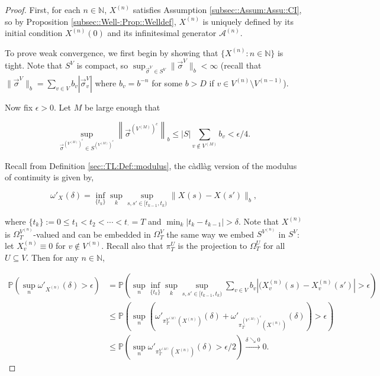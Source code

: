 \documentclass[12pt]{article}
\newcommand{\mb}{\mathbb}
\newcommand{\mc}{\mathcal}
\newcommand{\ra}{\rightarrow}
\newcommand{\os}{\overset}
\newcommand{\ep}{\epsilon}
\newcommand{\ind}{\hspace{24pt}}
\newcommand{\pr}{\mb{P}}							%
\renewcommand{\v}{v}							%
\renewcommand{\U}{U}							%
\renewcommand{\S}{S}							%
\newcommand{\s}{\sigma}							%
\newcommand{\sv}{\vec{\s}}						%
\renewcommand{\b}{b}							%
\newcommand{\T}{T}								%
\renewcommand{\t}{t}							%
\newcommand{\sset}{\Omega}						%
\newcommand{\proj}{\pi}							%
\renewcommand{\tt}{s}							%
\newcommand{\ttt}{s'}							%
\newcommand{\X}{X}								%
\newcommand{\IG}{\mc{A}}						%
\newcommand{\carp}[1]{^{#1}}					%
\newcommand{\vsi}[1]{^{#1}}						%
\newcommand{\cind}[1]{_{#1}}					%
\newcommand{\tp}[1]{(#1)}						%
\newcommand{\tip}[1]{#1}						%
\newcommand{\ts}[1]{_{#1}}						%
\newcommand{\degr}{D}							%
\newcommand{\sln}[1]{^{(#1)}}					%
\newcommand{\cconst}{M}							%
\newcommand{\cmodu}{\omega'}					%
\newcommand{\pra}[1]{_{#1}}						%
\newcommand{\indx}[1]{_{#1}}					%
\renewcommand{\it}{k}							%
\begin{document}
\begin{proof}
First, for each \(n\in\mb{N}\), \(\X\sln{n}\cind{}\tip{}\) satisfies Assumption \ref{subsec::Assum:Assu::CI}, so by Proposition \ref{subsec::Well-:Prop::Welldef}, \(\X\sln{n}\cind{}\tip{}\) is uniquely defined by its initial condition \(\X\sln{n}\cind{}\tp{0}\) and its infinitesimal generator \(\IG\sln{n}\).

\ind To prove weak convergence, we first begin by showing that \(\{\X\sln{n}\cind{}\tip{}:n\in \mb{N}\}\) is tight. Note that \(\S\carp{V}\) is compact, so \(\sup_{\sv\cind{}\vsi{V} \in \S\carp{V}} \|\sv\cind{}\vsi{V}\|_{\b} < \infty\) (recall that \(\|\sv\cind{}\vsi{V}\|_{\b} = \sum_{\v \in V} \b\cind{\v} |\sv\cind{\v}\vsi{V}|\) where \(\b\cind{\v} = \b^{-n}\) for some \(\b > \degr\) if \(\v \in V\sln{n}\setminus V\sln{n-1}\)).

\ind Now fix \(\ep > 0\). Let \(\cconst\) be large enough that

\[\sup_{\sv\cind{}\vsi{\left(V\sln{\cconst}\right)^c} \in \S\carp{\left(V\sln{\cconst}\right)^c}} \left\|\sv\cind{}\vsi{\left(V\sln{\cconst}\right)^c}\right\|_{\b} \leq |\S|\sum_{\v \notin V\sln{\cconst}} \b\cind{\v} < \ep/4.\]

Recall from Definition \ref{sec::TL:Def::modulus}, the c\`adl\`ag version of the modulus of continuity is given by,

\[\cmodu\pra{\X\cind{}\tip{}}(\delta) = \inf_{\{\t\indx{\it}\}} \sup_\it \sup_{\tt,\ttt \in [\t\indx{\it-1},\t\indx{\it})} \|\X\cind{}\tp{\tt} - \X\cind{}\tp{\ttt}\|_{\b},\]

where \(\{\t\indx{\it}\} := 0 \leq \t\indx{1} < \t\indx{2} < \cdots < \t\indx{\cdot} = \T\) and \(\min_\it|\t\indx{\it} - \t\indx{\it-1}| > \delta\). Note that \(\X\sln{n}\cind{}\tip{}\) is \(\sset\vsi{V\sln{n}}\ts{\T}\)-valued and can be embedded in \(\sset\vsi{V}\ts{\T}\) the same way we embed \(\S\carp{V\sln{n}}\) in \(\S\carp{V}\): let \(\X\sln{n}\cind{\v}\tip{} \equiv 0\) for \(\v \notin V\sln{n}\). Recall also that \(\proj\vsi{\U}\ts{\T}\) is the projection to \(\sset\vsi{\U}\ts{\T}\) for all \(\U\subseteq V\). Then for any \(n\in \mb{N}\),

\begin{align*}
\pr\left(\sup_n \cmodu\pra{\X\sln{n}\cind{}\tip{}}(\delta) > \epsilon\right) &= \pr\left(\sup_n\inf_{\{\t\indx{\it}\}}\sup_\it\sup_{\tt,\ttt \in [\t\indx{\it-1},\t\indx{\it})} \sum_{\v \in V} \b\cind{\v}|(\X\sln{n}\cind{\v}\tp{\tt} - \X\sln{n}\cind{\v}\tp{\ttt}| > \epsilon \right)\\
&\leq \pr\left(\sup_n \left(\cmodu\pra{\proj\vsi{V\sln{\cconst}}\ts{\T}(\X\sln{n}\cind{}\tip{})}(\delta) + \cmodu\pra{\proj\vsi{\left(V\sln{\cconst}\right)^c}\ts{\T}(\X\sln{n}\cind{}\tip{})}(\delta)\right) > \ep\right)\\
&\leq \pr\left(\sup_n \cmodu\pra{\proj\vsi{V\sln{\cconst}}\ts{\T}(\X\sln{n}\cind{}\tip{})}(\delta) > \ep/2\right) \os{\delta\searrow 0}{\ra} 0.
\end{align*}


\end{proof}
\end{document}
